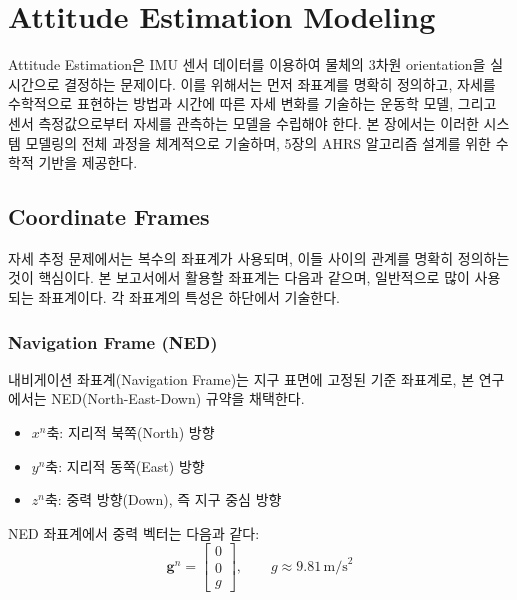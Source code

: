 \section{Attitude Estimation Modeling}
    Attitude Estimation은 IMU 센서 데이터를 이용하여 물체의 3차원 orientation을 실시간으로 결정하는 문제이다. 이를 위해서는 먼저 좌표계를 명확히 정의하고, 자세를 수학적으로 표현하는 방법과 시간에 따른 자세 변화를 기술하는 운동학 모델, 그리고 센서 측정값으로부터 자세를 관측하는 모델을 수립해야 한다. 본 장에서는 이러한 시스템 모델링의 전체 과정을 체계적으로 기술하며, 5장의 AHRS 알고리즘 설계를 위한 수학적 기반을 제공한다.\\

    \subsection{Coordinate Frames}
        자세 추정 문제에서는 복수의 좌표계가 사용되며, 이들 사이의 관계를 명확히 정의하는 것이 핵심이다. 본 보고서에서 활용할 좌표계는 다음과 같으며, 일반적으로 많이 사용되는 좌표계이다. 각 좌표계의 특성은 하단에서 기술한다.\\

        \subsubsection{Navigation Frame (NED)}
            내비게이션 좌표계(Navigation Frame)는 지구 표면에 고정된 기준 좌표계로, 본 연구에서는 NED(North-East-Down) 규약을 채택한다.
            
            \begin{itemize}
                \item $x^n$축: 지리적 북쪽(North) 방향
                \item $y^n$축: 지리적 동쪽(East) 방향
                \item $z^n$축: 중력 방향(Down), 즉 지구 중심 방향
            \end{itemize}

            NED 좌표계에서 중력 벡터는 다음과 같다:\\

            \begin{equation}
                \mathbf{g}^n = \begin{bmatrix} 0 \\ 0 \\ g \end{bmatrix}, \qquad g \approx 9.81\,\text{m/s}^2
                \label{eq:gravity_ned}
            \end{equation}

